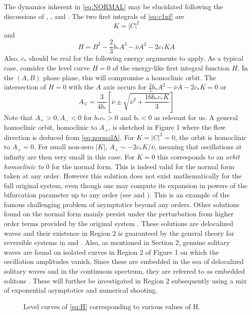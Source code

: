 The dynamics inherent in \eqref{eq:NORMAL} may be elucidated following the
discussions of \cite{IA}, \cite{IK}, \cite{Lombardi1} and \cite{Lombardi2}.
The two first integrals of \eqref{eq:c1nf}  are
\begin{equation}
K = \left| C \right|^2
\end{equation}
and
\begin{equation}\label{eq:H}
H = B^2 - \frac{2}{3} b_* A^3 - \bar{\nu} A^2 - 2 c_* K A
\end{equation}
Also, $c_*$ should be real  for the following energy arguments to apply.
As a typical case, consider  the level curve $H=0$ of the energy-like first
integral function $H$. In the $(A,B)$ phase plane, this will compromise a
homoclinic orbit. The intersection of $H=0$ with the $A$ axis occurs for $
\frac{2}{3} b_* A^2 - \bar{\nu}A - 2 c_* K = 0$ or
\begin{equation}
A_{\mp} = \frac{3}{4 b_*} \left[ \bar{\nu} \pm \sqrt{ \bar{\nu}^2 + \frac{16 b_* c_* K}{3} } \right]
\end{equation}
Note that $A_+ > 0, A_- < 0 $ for $b_* c_* > 0 $ and $b_* < 0$ as relevant for
us. A general homoclinic orbit, homoclinic to $A_+$, is sketched in Figure 1
where the flow direction is deduced from \eqref{eq:normalA}.  For
$K=\left|C\right|^2 = 0 $, the orbit is homoclinic to $A_+=0$. For small
non-zero $\left|K\right|$, $ A_+ \sim - 2 c_* K / \bar{\nu}$, meaning that
oscillations at infinity are then very small in this case. For $K=0$ this
corresponds to an \emph{orbit homoclinic to} 0 for the normal form. This is indeed
valid for the normal form taken at any order. However this solution does not
exist mathematically for the full original system, even though one may compute
its expansion in powers of the bifurcation parameter up to any order (see
\cite{Lombardi1} and \cite{Lombardi2}). This is an example of the famous
challenging problem of asymptotics beyond any orders. Other solutions found on
the normal form mainly persist under the perturbation from higher order terms
provided by the original system \cite{IK}. These solutions are delocalized
waves and their existence in Region 2 is guaranteed by the general theory for
reversible systems in \cite{Lombardi1} and \cite{Lombardi2}. Also, as mentioned
in Section 2, genuine solitary waves are found on isolated curves in Region 2
of Figure 1 on which the oscillation amplitudes vanish. Since these are
embedded in the sea of delocalized solitary waves and in the continuous
spectrum, they are referred to as embedded solitons \cite{CMYK}. These will
further be investigated in Region 2 subsequently using a mix of exponential
asymptotics and numerical shooting.

\begin{figure}[hh]
\begin{center}
\label{fig:homoclinic}
\caption{Level curves of \eqref{eq:H} corresponding to various values of H.}
\end{center}
\end{figure}


